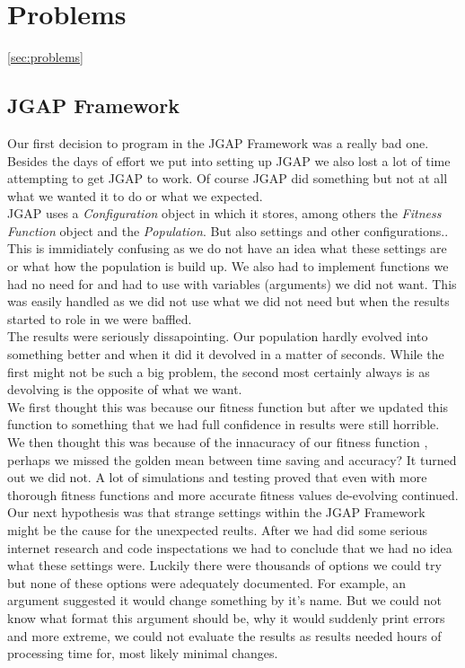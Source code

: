 \documentclass[a4paper,10pt]{article}
\begin{document}
\section{Problems}
\ref{sec:problems}
\subsection{JGAP Framework}
Our first decision to program in the JGAP Framework was a really bad one. Besides the days of effort we put into setting up JGAP we also lost a lot of time
attempting to get JGAP to work. Of course JGAP did something but not at all what we wanted it to do or what we expected. \\

JGAP uses a \textit{Configuration} object in which it stores, among others the \textit{Fitness Function} object and the \textit{Population}. But also settings 
and other configurations.. This is immidiately confusing as we do not have an idea what these settings are or what how the population is build up. We also had to 
implement functions we had no need for and had to use with variables (arguments) we did not want. This was easily handled as we did not use what we did not need but when 
the results started to role in we were baffled. \\

The results were seriously dissapointing. Our population hardly evolved into something better and when it did it devolved in a matter of seconds. While the first might not
be such a big problem, the second most certainly always is as devolving is the opposite of what we want.\\

We first thought this was because our fitness function but after
we updated this function to something that we had full confidence in results were still horrible. \\

We then thought this was because of the innacuracy of our fitness function
, perhaps we missed the golden mean between time saving and accuracy? It turned out we did not. A lot of simulations and testing proved that even with more thorough 
fitness functions and more accurate fitness values de-evolving continued. \\

Our next hypothesis was that strange settings within the JGAP Framework might be the cause for the unexpected reults. After we had did some serious internet research 
and code inspectations we had to conclude that 
we had no idea what these settings were. Luckily there were thousands of options we could try but none of these options were adequately documented. For example, an 
argument suggested it would change something by it's name. But we could not know what format this argument should be, why it would suddenly print errors and more extreme, 
we could not evaluate the results as results needed hours of processing time for, most likely minimal changes. \\
\end{document}
